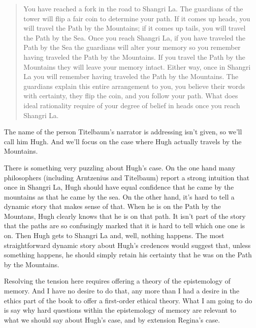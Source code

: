 \begin{quote}
You have reached a fork in the road to Shangri La. The guardians of the tower will flip a fair coin to determine your path. If it comes up heads, you will travel the Path by the Mountains; if it comes up tails, you will travel the Path by the Sea. Once you reach Shangri La, if you have traveled the Path by the Sea the guardians will alter your memory so you remember having traveled the Path by the Mountains. If you travel the Path by the Mountains they will leave your memory intact. Either way, once in Shangri La you will remember having traveled the Path by the Mountains. The guardians explain this entire arrangement to you, you believe their words with certainty, they flip the coin, and you follow your path. What does ideal rationality require of your degree of belief in heads once you reach Shangri La. ~\citep[120]{Titelbaum2014}
\end{quote}
The name of the person Titelbaum's narrator is addressing isn't given, so we'll call him \gls{Hugh}. And we'll focus on the case where \gls{Hugh} actually travels by the Mountains.

There is something very puzzling about \gls{Hugh}'s case. On the one hand many philosophers (including Arntzenius and Titelbaum) report a strong intuition that once in Shangri La, \gls{Hugh} should have equal confidence that he came by the mountains as that he came by the sea. On the other hand, it's hard to tell a dynamic story that makes sense of that. When he is on the Path by the Mountans, \gls{Hugh} clearly knows that he is on that path. It isn't part of the story that the paths are so confusingly marked that it is hard to tell which one one is on. Then \gls{Hugh} gets to Shangri La and, well, nothing happens. The most straightforward dynamic story about \gls{Hugh}'s credences would suggest that, unless something happens, he should simply retain his certainty that he was on the Path by the Mountains.

Resolving the tension here requires offering a theory of the epistemology of memory. And I have no desire to do that, any more than I had a desire in the ethics part of the book to offer a first-order ethical theory. What I am going to do is say why hard questions within the epistemology of memory are relevant to what we should say about \gls{Hugh}'s case, and by extension \gls{Regina}'s case.


